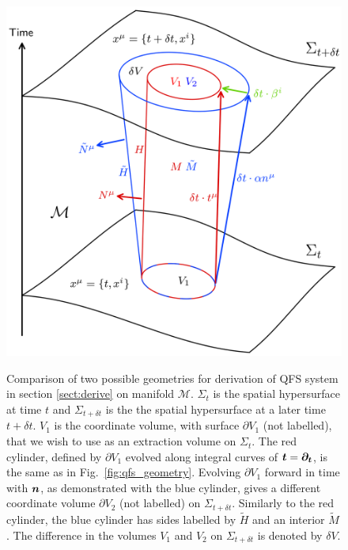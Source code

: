 \begin{figure}[h]
{\includegraphics[width=1.0\columnwidth]{png/qfs_coloured.png}}
\caption{Comparison of two possible geometries for derivation of QFS system in section \ref{sect:derive} on manifold $\mathcal{M}$. $\Sigma_t$ is the spatial hypersurface at time $t$ and $\Sigma_{t+\delta t}$ is the the spatial hypersurface at a later time $t+\delta t$. $V_1$ is the coordinate volume, with surface $\partial V_1$ (not labelled), that we wish to use as an extraction volume on $\Sigma_t$. The red cylinder, defined by $\partial V_1$ evolved along integral curves of $\boldsymbol{t}=\boldsymbol{\partial_t}$, is the same as in Fig.~\ref{fig:qfs_geometry}. Evolving $\partial V_1$ forward in time with $\boldsymbol n$, as demonstrated with the blue cylinder, gives a different coordinate volume $\partial V_2$ (not labelled) on $\Sigma_{t+\delta t}$. Similarly to the red cylinder, the blue cylinder has sides labelled by $\tilde{H}$ and an interior $\tilde{M}$. The difference in the volumes $V_1$ and $V_2$ on $\Sigma_{t+\delta t}$ is denoted by $\delta V.$ }
\label{fig:qfs_comparison}
\end{figure}

